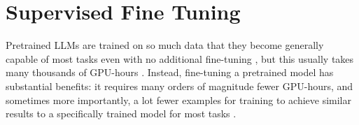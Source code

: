 % 
% 
% 





\section{Supervised Fine Tuning}\label{sec:res:sft}
Pretrained \glspl{LLM} are trained on so much data that they become generally capable of most tasks even with no additional fine-tuning \cite{brown_language_2020}, but this usually takes many thousands of GPU-hours \cite{touvron_llama_2023, scao_what_2022}.
Instead, fine-tuning a pretrained model has substantial benefits: it requires many orders of magnitude fewer GPU-hours, and sometimes more importantly, a lot fewer examples for training to achieve similar results to a specifically trained model for most tasks \cite{gaddipati_comparative_2020}.

